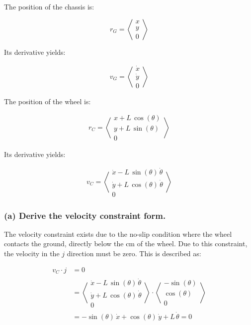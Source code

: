 \documentclass[12pt, letterpaper]{../assignment}
\begin{document}
The position of the chassis is:

$$ r_G = \left<\begin{array}{c}
x\\
y\\
0
\end{array}\right> $$

Its derivative yields:

$$ v_G = \left<\begin{array}{c}
\dot{x}\\
\dot{y}\\
0
\end{array}\right> $$

The position of the wheel is:

$$ r_C = \left<\begin{array}{c}
x+L\,\cos \left(\theta \right)\\
y+L\,\sin \left(\theta \right)\\
0
\end{array}\right> $$

Its derivative yields:

$$ v_C = \left<\begin{array}{c}
\dot{x}-L\,\sin \left(\theta \right)\,\dot{\theta} \\
\dot{y}+L\,\cos \left(\theta \right)\,\dot{\theta} \\
0
\end{array}\right> $$


\subsubsection*{(a) Derive the velocity constraint form.}

The velocity constraint exists due to the no-slip condition where the wheel contacts the ground,
directly below the cm of the wheel.
Due to this constraint, the velocity in the $j$ direction must be zero.
This is described as:

\begin{equation*}
  \begin{aligned}
    v_C \cdot j &= 0 \\
      &= \left<\begin{array}{c}\dot{x}-L\,\sin \left(\theta \right)\,\dot{\theta} \\\dot{y}+L\,\cos \left(\theta \right)\,\dot{\theta} \\0\end{array}\right>
         \cdot \left<\begin{array}{r} -\sin\left(\theta \right)\\ \cos\left(\theta \right)\\ 0 \end{array}\right> \\
      &= -\sin \left(\theta \right)\,\dot{x} +\cos \left(\theta \right)\,\dot{y}+ L\,\dot{\theta}=0
  \end{aligned}
\end{equation*}
\end{document}
